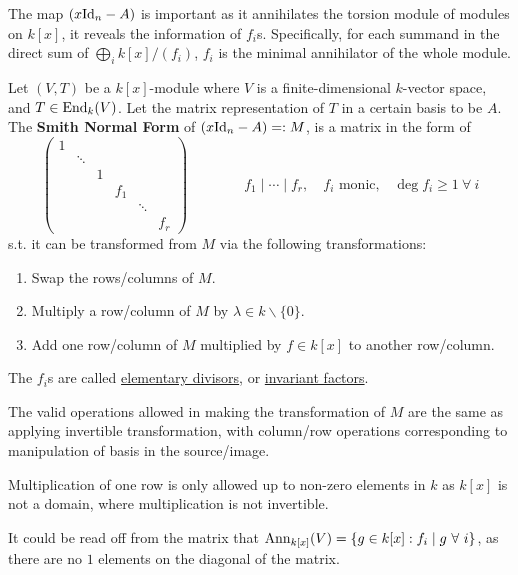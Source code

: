 The map $(x\mathrm{Id}_n - A)$ is important as it annihilates the torsion module of modules on $k[x]$, it reveals the information of $f_i$s. Specifically, for each summand in the direct sum of $\bigoplus_i k[x]/(f_i)$, $f_i$ is the minimal annihilator of the whole module. 

\begin{definition}
    Let $(V, T)$ be a $k[x]$-module where $V$ is a finite-dimensional $k$-vector space, and $T\in \mathrm{End}_k(V)$. Let the matrix representation of $T$ in a certain basis to be $A$. The \textbf{Smith Normal Form} of $(x\mathrm{Id}_n - A) =: M$, is a matrix in the form of
    \[
        \left(\begin{smallmatrix}
            1 & & & & & \\[0pt]
            & \ddots & & & & \\[0pt]
            & & 1 & & & \\[0pt]
            & & & f_1 & & \\[0pt]
            & & & & \ddots & \\[0pt]
            & & & & & f_r
        \end{smallmatrix}\right) \qquad \qquad f_1\mid \cdots \mid f_r,\quad f_i \text{ monic,}\quad \deg f_i \geq 1\ \forall\ i
    \]
    s.t. it can be transformed from $M$ via the following transformations:
    \begin{enumerate}
        \item Swap the rows/columns of $M$.
        \item Multiply a row/column of $M$ by $\lambda \in k\smallsetminus \{0\}$.
        \item Add one row/column of $M$ multiplied by $f \in k[x]$ to another row/column.
    \end{enumerate}
    The $f_i$s are called \underline{elementary divisors}, or \underline{invariant factors}.
\end{definition}

\begin{remark}
    The valid operations allowed in making the transformation of $M$ are the same as applying invertible transformation, with column/row operations corresponding to manipulation of basis in the source/image.

    Multiplication of one row is only allowed up to non-zero elements in $k$ as $k[x]$ is not a domain, where multiplication is not invertible.
\end{remark}

\begin{remark}
    It could be read off from the matrix that $\Ann_{k[x]}(V) = \{g \in k[x] : f_i \mid g\ \forall\ i\}$, as there are no $1$ elements on the diagonal of the matrix.  
\end{remark}

